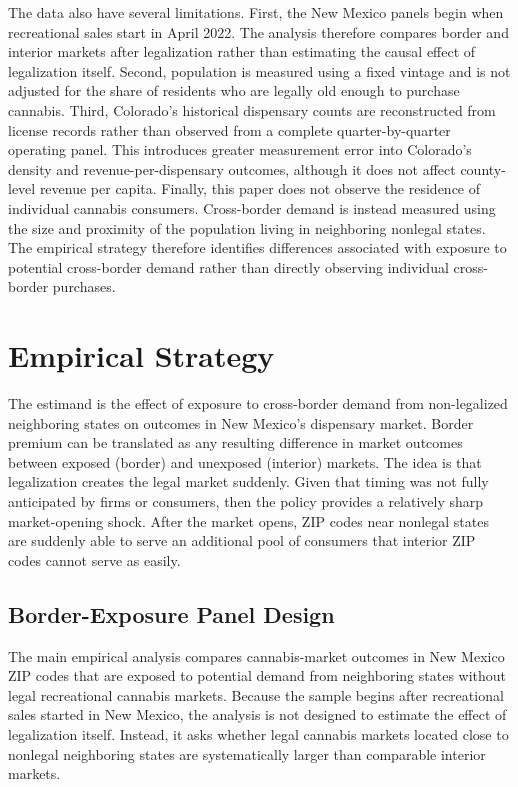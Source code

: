 \documentclass[english,12pt]{article}
\begin{document}


The data also have several limitations. First, the New Mexico panels begin when recreational sales start in April 2022. The analysis therefore compares border and interior markets after legalization rather than estimating the causal effect of legalization itself. Second, population is measured using a fixed vintage and is not adjusted for the share of residents who are legally old enough to purchase cannabis. Third, Colorado's historical dispensary counts are reconstructed from license records rather than observed from a complete quarter-by-quarter operating panel. This introduces greater measurement error into Colorado's density and revenue-per-dispensary outcomes, although it does not affect county-level revenue per capita. Finally, this paper does not observe the residence of individual cannabis consumers. Cross-border demand is instead measured using the size and proximity of the population living in neighboring nonlegal states. The empirical strategy therefore identifies differences associated with exposure to potential cross-border demand rather than directly observing individual cross-border purchases.

\section{Empirical Strategy}
\label{sec:empirical}

The estimand is the effect of exposure to
cross-border demand from non-legalized neighboring states on outcomes in
New Mexico's dispensary market. Border premium can be translated as any
resulting difference in market outcomes between exposed (border) and unexposed (interior) markets. The idea is that legalization creates the legal market suddenly. Given that timing was not fully anticipated by firms or consumers, then the policy provides a relatively sharp market-opening shock. After the market opens, ZIP codes near nonlegal states are suddenly able to serve an additional pool of consumers that interior ZIP codes cannot serve as easily.

\subsection{Border-Exposure Panel Design}
\label{sec:borderexposure}

The main empirical analysis compares cannabis-market outcomes in New Mexico ZIP codes that are exposed to potential demand from neighboring states without legal recreational cannabis markets. Because the sample begins after recreational sales started in New Mexico, the analysis is not designed to estimate the effect of legalization itself. Instead, it asks whether legal cannabis markets located close to nonlegal neighboring states are systematically larger than comparable interior markets.
\end{document}
